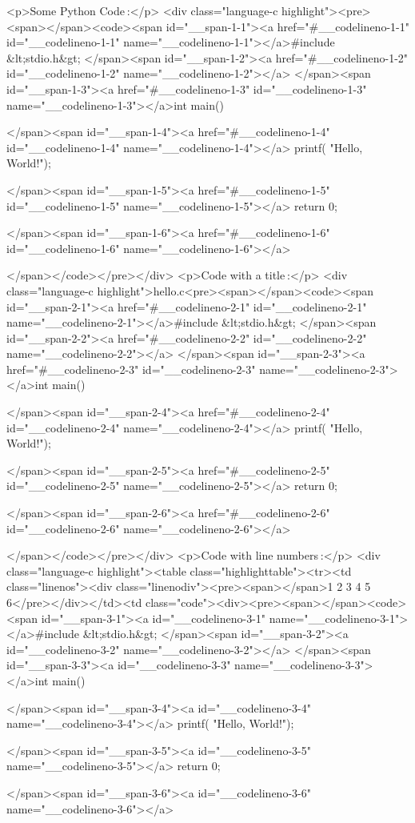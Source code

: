 <p>Some Python Code :</p>
<div class="language-c highlight"><pre><span></span><code><span id="__span-1-1"><a href="#__codelineno-1-1" id="__codelineno-1-1" name="__codelineno-1-1"></a>#include &lt;stdio.h&gt;
</span><span id="__span-1-2"><a href="#__codelineno-1-2" id="__codelineno-1-2" name="__codelineno-1-2"></a>
</span><span id="__span-1-3"><a href="#__codelineno-1-3" id="__codelineno-1-3" name="__codelineno-1-3"></a>int main()
 {

</span><span id="__span-1-4"><a href="#__codelineno-1-4" id="__codelineno-1-4" name="__codelineno-1-4"></a>    printf(
"Hello, World!\n");

</span><span id="__span-1-5"><a href="#__codelineno-1-5" id="__codelineno-1-5" name="__codelineno-1-5"></a>    return 0;

</span><span id="__span-1-6"><a href="#__codelineno-1-6" id="__codelineno-1-6" name="__codelineno-1-6"></a>}

</span></code></pre></div>
<p>Code with a title :</p>
<div class="language-c highlight">hello.c<pre><span></span><code><span id="__span-2-1"><a href="#__codelineno-2-1" id="__codelineno-2-1" name="__codelineno-2-1"></a>#include &lt;stdio.h&gt;
</span><span id="__span-2-2"><a href="#__codelineno-2-2" id="__codelineno-2-2" name="__codelineno-2-2"></a>
</span><span id="__span-2-3"><a href="#__codelineno-2-3" id="__codelineno-2-3" name="__codelineno-2-3"></a>int main()
 {

</span><span id="__span-2-4"><a href="#__codelineno-2-4" id="__codelineno-2-4" name="__codelineno-2-4"></a>    printf(
"Hello, World!\n");

</span><span id="__span-2-5"><a href="#__codelineno-2-5" id="__codelineno-2-5" name="__codelineno-2-5"></a>    return 0;

</span><span id="__span-2-6"><a href="#__codelineno-2-6" id="__codelineno-2-6" name="__codelineno-2-6"></a>}

</span></code></pre></div>
<p>Code with line numbers :</p>
<div class="language-c highlight"><table class="highlighttable"><tr><td class="linenos"><div class="linenodiv"><pre><span></span>1
2
3
4
5
6</pre></div></td><td class="code"><div><pre><span></span><code><span id="__span-3-1"><a id="__codelineno-3-1" name="__codelineno-3-1"></a>#include &lt;stdio.h&gt;
</span><span id="__span-3-2"><a id="__codelineno-3-2" name="__codelineno-3-2"></a>
</span><span id="__span-3-3"><a id="__codelineno-3-3" name="__codelineno-3-3"></a>int main()
 {

</span><span id="__span-3-4"><a id="__codelineno-3-4" name="__codelineno-3-4"></a>    printf(
"Hello, World!\n");

</span><span id="__span-3-5"><a id="__codelineno-3-5" name="__codelineno-3-5"></a>    return 0;

</span><span id="__span-3-6"><a id="__codelineno-3-6" name="__codelineno-3-6"></a>}

